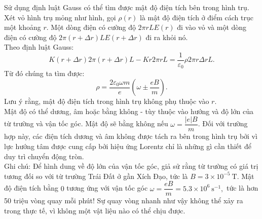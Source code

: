 \begin{loigiai}
\begin{center}
\end{center}
Sử dụng định luật Gauss có thể tìm được mật độ điện tích bên trong hình trụ. Xét vỏ hình trụ mỏng như hình, gọi $\rho(r)$ là mật độ điện tích ở điểm cách trục một khoảng $r$. Một dòng điện có cường độ $ 2\pi rLE(r)$ đi vào vỏ và một dòng điện có cường độ $ 2\pi\left(r+\Delta r\right)LE\left(r+\Delta r\right)$ đi ra khỏi nó.\\
Theo định luật Gauss:
$$ K\left(r+\Delta r\right)2\pi\left(r+\Delta r\right)L-Kr2\pi rL=\dfrac{1}{\varepsilon_0}\rho 2\pi r\Delta rL.$$
Từ đó chúng ta tìm được:
$$\rho=\dfrac{2\varepsilon_0\omega m}{e}\left(\omega\pm\dfrac{eB}{m}\right).$$
Lưu ý rằng, mật độ điện tích trong hình trụ không phụ thuộc vào $r$.\\
Mật độ có thể dương, âm hoặc bằng không - tùy thuộc vào hướng và độ lớn của từ trường và vận tốc góc. Mật độ sẽ bằng không nếu $\omega=\dfrac{|e|B}{m}$. Đối với trường hợp này, các điện tích dương và âm không được tách ra bên trong hình trụ bởi vì lực hướng tâm được cung cấp bởi hiệu ứng Lorentz chỉ là những gì cần thiết để duy trì chuyển động tròn.\\
Ghi chú: Để hình dung về độ lớn của vận tốc góc, giả sử rằng từ trường có giá trị tương đối so với từ trường Trái Đất ở gần Xích Đạo, tức là $ B=3\times{10^{-5}}\ \mathrm{T}$. Mật độ điện tích bằng $0$ tương ứng với vận tốc góc $\omega=\dfrac{eB}{m}=5.3\times{10^6}\ \mathrm{s^{-1}},$ tức là hơn 50 triệu vòng quay mỗi phút! Sự quay vòng nhanh như vậy không thể xảy ra trong thực tế, vì không một vật liệu nào có thể chịu được.
\end{loigiai}



